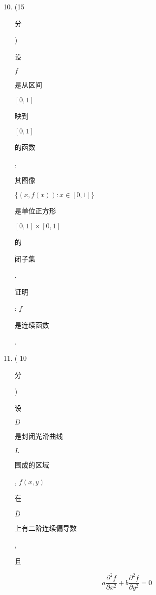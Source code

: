 \documentclass[10pt]{article}
\begin{document}
\begin{enumerate}
  \setcounter{enumi}{9}
  \item (15 \begin{CJK}{UTF8}{mj}分\end{CJK}) \begin{CJK}{UTF8}{mj}设\end{CJK} $f$ \begin{CJK}{UTF8}{mj}是从区间\end{CJK} $[0,1]$ \begin{CJK}{UTF8}{mj}映到\end{CJK} $[0,1]$ \begin{CJK}{UTF8}{mj}的函数\end{CJK}, \begin{CJK}{UTF8}{mj}其图像\end{CJK} $\{(x, f(x)): x \in[0,1]\}$ \begin{CJK}{UTF8}{mj}是单位正方形\end{CJK} $[0,1] \times[0,1]$ \begin{CJK}{UTF8}{mj}的\end{CJK} \begin{CJK}{UTF8}{mj}闭子集\end{CJK}. \begin{CJK}{UTF8}{mj}证明\end{CJK}: $f$ \begin{CJK}{UTF8}{mj}是连续函数\end{CJK}.

  \item ( 10 \begin{CJK}{UTF8}{mj}分\end{CJK}) \begin{CJK}{UTF8}{mj}设\end{CJK} $D$ \begin{CJK}{UTF8}{mj}是封闭光滑曲线\end{CJK} $L$ \begin{CJK}{UTF8}{mj}围成的区域\end{CJK}, $f(x, y)$ \begin{CJK}{UTF8}{mj}在\end{CJK} $\bar{D}$ \begin{CJK}{UTF8}{mj}上有二阶连续偏导数\end{CJK}, \begin{CJK}{UTF8}{mj}且\end{CJK}

\end{enumerate}
$$
a \frac{\partial^{2} f}{\partial x^{2}}+b \frac{\partial^{2} f}{\partial y^{2}}=0
$$
\end{document}
